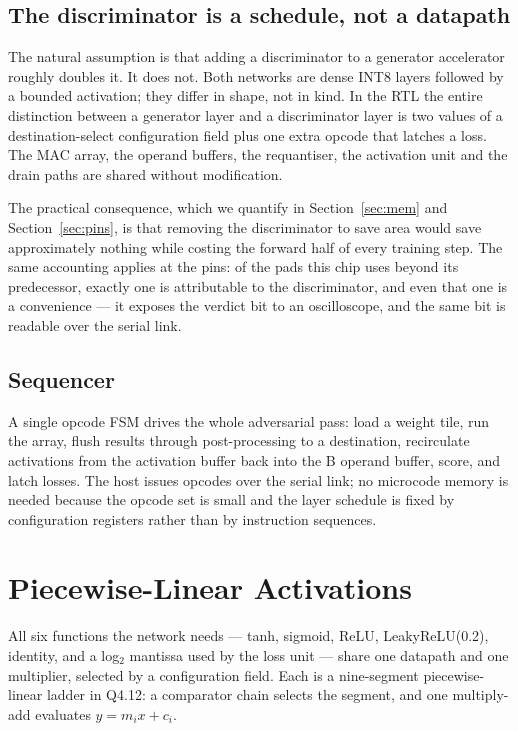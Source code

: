 \documentclass[conference,a4paper]{APSIPA2026}
\begin{document}
\subsection{The discriminator is a schedule, not a datapath}
The natural assumption is that adding a discriminator to a generator accelerator roughly doubles it. It does not. Both networks are dense INT8 layers followed by a bounded activation; they differ in shape, not in kind. In the RTL the entire distinction between a generator layer and a discriminator layer is two values of a destination-select configuration field plus one extra opcode that latches a loss. The MAC array, the operand buffers, the requantiser, the activation unit and the drain paths are shared without modification.

The practical consequence, which we quantify in Section~\ref{sec:mem} and Section~\ref{sec:pins}, is that removing the discriminator to save area would save approximately nothing while costing the forward half of every training step. The same accounting applies at the pins: of the pads this chip uses beyond its predecessor, exactly one is attributable to the discriminator, and even that one is a convenience --- it exposes the verdict bit to an oscilloscope, and the same bit is readable over the serial link.

\subsection{Sequencer}
A single opcode FSM drives the whole adversarial pass: load a weight tile, run the array, flush results through post-processing to a destination, recirculate activations from the activation buffer back into the B operand buffer, score, and latch losses. The host issues opcodes over the serial link; no microcode memory is needed because the opcode set is small and the layer schedule is fixed by configuration registers rather than by instruction sequences.

\section{Piecewise-Linear Activations}\label{sec:pwl}
All six functions the network needs --- tanh, sigmoid, ReLU, LeakyReLU(0.2), identity, and a log$_2$ mantissa used by the loss unit --- share one datapath and one multiplier, selected by a configuration field. Each is a nine-segment piecewise-linear ladder in Q4.12: a comparator chain selects the segment, and one multiply-add evaluates $y = m_ix + c_i$.
\end{document}
